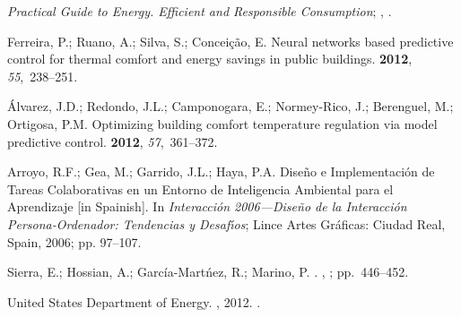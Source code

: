 \documentclass[energies,article,accept,moreauthors,pdftex,12pt,a4paper]{mdpi}
\begin{document}

\makeatletter
\renewcommand\@biblabel[1]{#1. }
\makeatother


\begin{thebibliography}{----}
\providecommand{\natexlab}[1]{#1}

{\em {Practical Guide to Energy. Efficient and Responsible
 Consumption}}; ,
.

Ferreira, P.; Ruano, A.; Silva, S.; Concei{\c c}{\~a}o, E.
\newblock Neural networks based predictive control for thermal comfort and
 energy savings in public buildings.
 {\bf 2012}, {\em 55},~238--251.

{\'A}lvarez, J.D.; Redondo, J.L.; Camponogara, E.; Normey-Rico, J.; Berenguel, M.;
 Ortigosa, P.M.
\newblock Optimizing building comfort temperature regulation via model
 predictive control.
\newblock
{} {\bf 2012}, {\it 57},~361--372.

Arroyo, R.F.; Gea, M.; Garrido, J.L.; Haya, P.A. Dise{\~n}o e Implementaci{\'o}n de
 Tareas Colaborativas en un Entorno de Inteligencia Ambiental para el
Aprendizaje [in Spainish]. 
\newblock In {\em Interacci{\'o}n 2006---Dise{\~n}o de la Interacci{\'o}n
 Persona-Ordenador: Tendencias y Desaf{\'\i}os}; Lince Artes Gr{\'a}ficas: Ciudad Real, Spain,
 2006;
\newblock pp. 97--107.

Sierra, E.; Hossian, A.; Garc\'ia-Mart\'nez, R.; Marino, P.
.
,
; pp.~446--452.

{United States Department of Energy}.
, 2012.
\newblock
{}.


\end{thebibliography}
\end{document}
